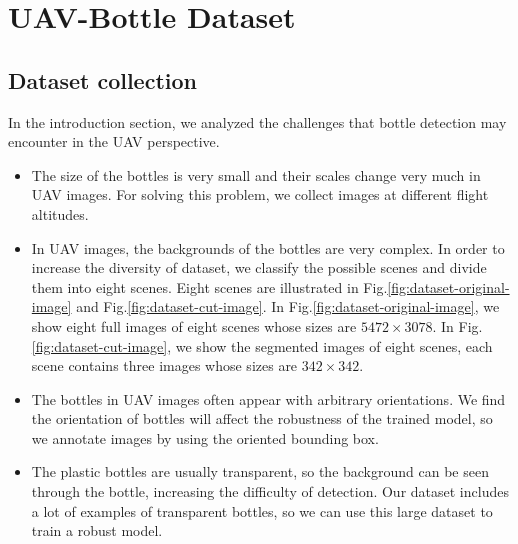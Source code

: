 \section{UAV-Bottle Dataset}
\label{sec:dataset}


\subsection{Dataset collection}
\label{ssec:image_collection}

In the introduction section, we analyzed the challenges that bottle detection may encounter in the UAV perspective.
\begin{itemize}
	\item The size of the bottles is very small and their scales change very much in UAV images. For solving this problem, we collect images at different flight altitudes.
	
	\item In UAV images, the backgrounds of the bottles are very complex. In order to increase the diversity of dataset, we classify the possible scenes and divide them into eight scenes. Eight scenes are illustrated in Fig.\ref{fig:dataset-original-image} and Fig.\ref{fig:dataset-cut-image}. In Fig.\ref{fig:dataset-original-image}, we show eight full images of eight scenes whose sizes are $ 5472\times 3078 $. In Fig.\ref{fig:dataset-cut-image}, we show the segmented images of eight scenes, each scene contains three images whose sizes are $ 342 \times 342 $.
	
	\item The bottles in UAV images often appear with arbitrary orientations. We find the orientation of bottles will affect the robustness of the trained model, so we annotate images by using the oriented bounding box.
	
	\item The plastic bottles are usually transparent, so the background can be seen through the bottle, increasing the difficulty of detection. Our dataset includes a lot of examples of  transparent bottles, so we can use this large dataset to train a robust model.
\end{itemize}
